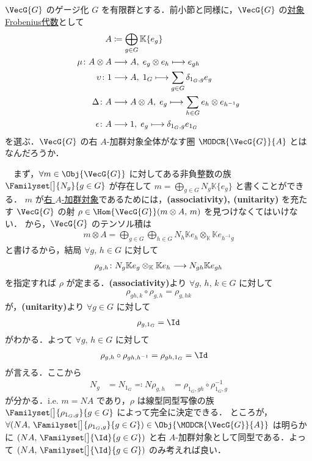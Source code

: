 \documentclass[TQFT_main]{subfiles}
\begin{document}
\begin{myexample}[label=ex:gauging-VecG]{$\VecG{G}$ のゲージ化}
    $G$ を有限群とする．前小節と同様に，$\VecG{G}$ の\hyperref[def:sym-Frobenius]{対象Frobenius代数}として
    \begin{align}
        A &\coloneqq \bigoplus_{g \in G} \mathbb{K} \{e_g\} \\
        \mu \colon A \otimes A &\longrightarrow A,\; e_g \otimes e_h \longmapsto e_{gh} \\
        \upsilon \colon 1 &\longrightarrow A,\; 1_G \longmapsto \sum_{g \in G} \delta_{1_G,g} e_g \\
        \Delta \colon A &\longrightarrow A \otimes A,\; e_g \longmapsto \sum_{h \in G} e_h \otimes e_{h^{-1}g} \\
        \epsilon \colon A &\longrightarrow 1,\; e_g \longmapsto \delta_{1_G,g} e_{1_G}
    \end{align}
    を選ぶ．$\VecG{G}$ の右 $A$-加群対象全体がなす圏 $\MODCR{\VecG{G}}{A}$ とはなんだろうか．

    　まず，$\forall m \in \Obj{\VecG{G}}$ に対してある非負整数の族 $\Familyset[\big]{N_g}{g \in G}$ が存在して $m = \bigoplus_{g \in G} N_g \mathbb{K} \{e_g\}$ と書くことができる．
    $m$ が\hyperref[def:moduleobj]{右 $A$-加群対象}であるためには，\textsf{\textbf{(associativity), (unitarity)}} を充たす $\VecG{G}$ の射 $\rho \in \Hom{\VecG{G}}(m \otimes A,\, m)$ を見つけなくてはいけない．
    から，$\VecG{G}$ のテンソル積は
    \begin{align}
        m \otimes A = \bigoplus_{g \in G}  \bigoplus_{h \in G} N_h \mathbb{K} e_h \otimes_{\mathbb{K}} \mathbb{K}e_{h^{-1}g}
    \end{align}
    と書けるから，結局 $\forall g,\, h \in G$ に対して
    \begin{align}
        \rho_{g,h} \colon N_g \mathbb{K} e_g \otimes_{\mathbb{K}} \mathbb{K} e_{h} \longrightarrow N_{gh} \mathbb{K} e_{gh}
    \end{align}
    を指定すれば $\rho$ が定まる．\textsf{\textbf{(associativity)}}より $\forall g,\, h,\, k \in G$ に対して
    \begin{align}
        \rho_{gh,k} \circ \rho_{g,h} = \rho_{g,hk}
    \end{align}
    が，\textsf{\textbf{(unitarity)}}より $\forall g \in G$ に対して
    \begin{align}
        \rho_{g, 1_G} = \Id
    \end{align}
    がわかる．よって $\forall g,\, h \in G$ に対して
    \begin{align}
        \rho_{g,h} \circ \rho_{gh,h^{-1}} 
        &= \rho_{gh,1_G} = \Id
    \end{align}
    が言える．ここから
    \begin{align}
        N_g &= N_{1_G} \eqqcolon N
        \rho_{g,h} &= \rho_{1_G,gh} \circ \rho_{1_G,g}^{-1}
    \end{align}
    が分かる．i.e. $m = N A$ であり，$\rho$ は線型同型写像の族 $\Familyset[\big]{\rho_{1_G,g}}{g \in G}$ によって完全に決定できる．
    ところが，$\forall (NA,\, \Familyset[\big]{\rho_{1_G,g}}{g \in G}) \in \Obj{\MODCR{\VecG{G}}{A}}$ は明らかに $(NA,\, \Familyset[\big]{\Id}{g \in G})$ と右 $A$-加群対象として同型である．よって $(NA,\, \Familyset[\big]{\Id}{g \in G})$ のみ考えれば良い．


\end{myexample}
\end{document}
